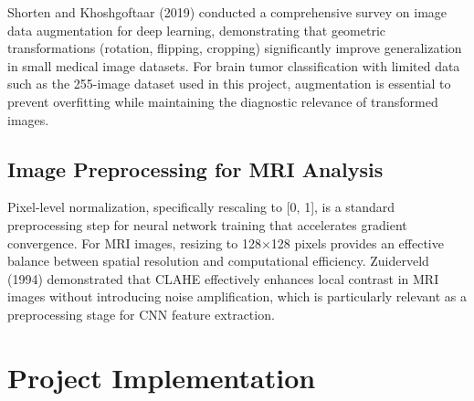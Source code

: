 \documentclass[12pt,a4paper]{article}
\begin{document}
Shorten and Khoshgoftaar (2019) conducted a comprehensive survey on image data augmentation for deep learning, demonstrating that geometric transformations (rotation, flipping, cropping) significantly improve generalization in small medical image datasets. For brain tumor classification with limited data such as the 255-image dataset used in this project, augmentation is essential to prevent overfitting while maintaining the diagnostic relevance of transformed images.

\subsection{Image Preprocessing for MRI Analysis}

Pixel-level normalization, specifically rescaling to [0, 1], is a standard preprocessing step for neural network training that accelerates gradient convergence. For MRI images, resizing to 128$\times$128 pixels provides an effective balance between spatial resolution and computational efficiency. Zuiderveld (1994) demonstrated that CLAHE effectively enhances local contrast in MRI images without introducing noise amplification, which is particularly relevant as a preprocessing stage for CNN feature extraction.

\newpage

%
%

\section{Project Implementation}
\end{document}
